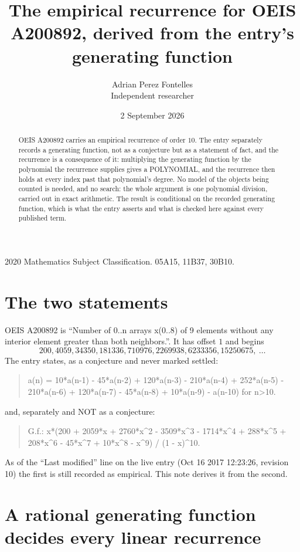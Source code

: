 \documentclass[11pt,a4paper]{article}
\title{The empirical recurrence for OEIS A200892, derived from the entry's generating function}
\author{Adrian Perez Fontelles\\ \small Independent researcher}
\date{2 September 2026}
\theoremstyle{plain}
\theoremstyle{definition}
\begin{document}
\maketitle

\begin{abstract}
OEIS A200892 carries an empirical recurrence of order $10$. The entry separately records a
generating function, not as a conjecture but as a statement of fact, and the recurrence is a
consequence of it: multiplying the generating function by the polynomial the recurrence
supplies gives a POLYNOMIAL, and the recurrence then holds at every index past that
polynomial's degree. No model of the objects being counted is needed, and no search: the
whole argument is one polynomial division, carried out in exact arithmetic. The result is
conditional on the recorded generating function, which is what the entry asserts and what is
checked here against every published term.
\end{abstract}

\noindent\small 2020 Mathematics Subject Classification. 05A15, 11B37, 30B10.\normalsize

\section{The two statements}

OEIS A200892 is ``Number of 0..n arrays x(0..8) of 9 elements without any interior element greater than both neighbors.''. It has offset $1$ and begins
\[
200, 4059, 34350, 181336, 710976, 2269938, 6233356, 15250675,\ \dots
\]
The entry states, as a conjecture and never marked settled:
\begin{quote}
a(n) = 10*a(n-1) - 45*a(n-2) + 120*a(n-3) - 210*a(n-4) + 252*a(n-5) - 210*a(n-6) + 120*a(n-7) - 45*a(n-8) + 10*a(n-9) - a(n-10) for n>10.
\end{quote}
and, separately and NOT as a conjecture:
\begin{quote}
G.f.: x*(200 + 2059*x + 2760*x\^{}2 - 3509*x\^{}3 - 1714*x\^{}4 + 288*x\^{}5 + 208*x\^{}6 - 45*x\^{}7 + 10*x\^{}8 - x\^{}9) / (1 - x)\^{}10.
\end{quote}
As of the ``Last modified'' line on the live entry (Oct 16 2017 12:23:26, revision 10) the first is still
recorded as empirical. This note derives it from the second.

\section{A rational generating function decides every linear recurrence}
\end{document}
